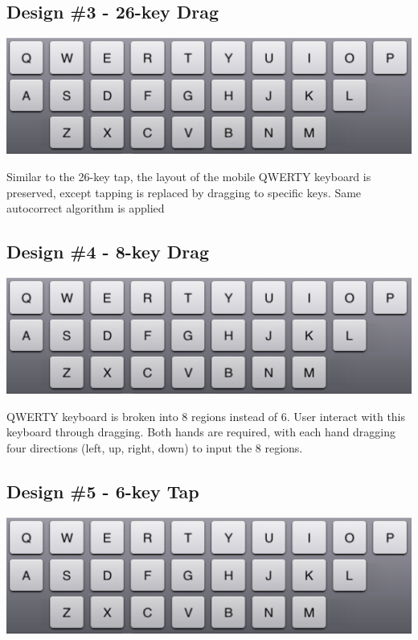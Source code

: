 \subsection{Design \#3 - 26-key Drag}
\vspace*{.1cm}
\includegraphics[width=.9\columnwidth]{figures/26Tap}

Similar to the 26-key tap, the layout of the mobile QWERTY keyboard is preserved, except tapping is replaced by dragging to specific keys.
Same autocorrect algorithm is applied


\subsection{Design \#4 - 8-key Drag}
\vspace*{.1cm}
\includegraphics[width=.9\columnwidth]{figures/26Tap}

QWERTY keyboard is broken into 8 regions instead of 6.
User interact with this keyboard through dragging.
Both hands are required, with each hand dragging four directions (left, up, right, down) to input the 8 regions.

\subsection{Design \#5 - 6-key Tap}
\vspace*{.1cm}
\includegraphics[width=.9\columnwidth]{figures/26Tap}

